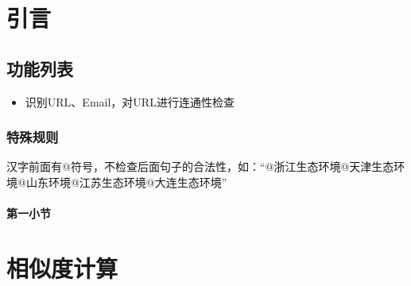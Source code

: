 \chapter{引言}

\section{功能列表}

\begin{itemize}
\item 识别URL、Email，对URL进行连通性检查
  
\end{itemize}

\subsection{特殊规则}

汉字前面有@符号，不检查后面句子的合法性，如：“@浙江生态环境@天津生态环境@山东环境@江苏生态环境@大连生态环境”

\subsubsection{第一小节}


\chapter{相似度计算}


